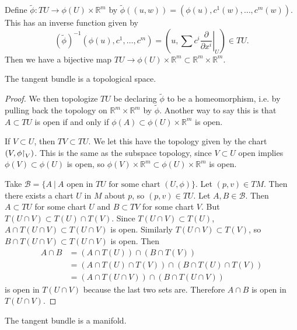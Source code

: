 Define $\tilde{\phi}: TU \to \phi(U) \times \mathbb{R}^m$ by
$\tilde{\phi}((u, w)) = (\phi(u), c^1(w), \dots, c^m(w))$.
This has an inverse function given by
$$
(\tilde{\phi})^{-1}(\phi(u), c^1, \dots, c^m)
= (u, \sum c^i \left.\frac{\partial}{\partial x^i}\right|_U)
\in TU.
$$
Then we have a bijective map
$TU \to \phi(U) \times \mathbb{R}^m \subset \mathbb{R}^m \times
\mathbb{R}^m$.

\begin{prop}
The tangent bundle is a topological space.
\end{prop}

\begin{proof}
We then topologize $TU$ be declaring $\tilde{\phi}$ to be a
homeomorphism, i.e. by pulling back the topology on
$\mathbb{R}^m \times \mathbb{R}^m$ by $\tilde{\phi}$. Another way to
say this is that $A \subset TU$ is open if and only if
$\phi(A) \subset \phi(U) \times \mathbb{R}^m$ is open.

If $V \subset U$, then $TV \subset TU$. We let this have the topology
given by the chart $(V, \phi\mathord{\upharpoonright}_V)$. This is the same as the
subspace topology, since $V \subset U$ open implies
$\phi(V) \subset \phi(U)$ is open, so
$\phi(V) \times \mathbb{R}^m \subset \phi(U) \times \mathbb{R}^m$ is
open.

Take $\mathscr{B} = \{ A ~\vert~ A \text{ open in $TU$ for some chart
  $(U , \phi)$} \}$. Let $(p, v) \in TM$.
Then there exists a chart $U$ in $M$ about $p$, so $(p, v) \in TU$.
Let $A, B \in \mathscr{B}$. Then $A \subset TU$ for some chart $U$
and $B \subset TV$ for some chart $V$.
But $T(U \cap V) \subset T(U) \cap T(V)$.
Since $T(U \cap V) \subset T(U)$,
$A \cap T(U \cap V) \subset T(U \cap V)$ is open. Similarly
$T(U \cap V) \subset T(V)$, so
$B \cap T(U \cap V) \subset T(U \cap V)$ is open. Then
\begin{align*}
   A \cap B
&= (A \cap T(U)) \cap (B \cap T(V)) \\
&= (A \cap T(U) \cap T(V)) \cap (B \cap T(U) \cap T(V)) \\
&= (A \cap T(U \cap V)) \cap (B \cap T(U \cap V))
\end{align*}
is open in $T(U \cap V)$ because the last two sets are. Therefore
$A \cap B$ is open in $T(U \cap V)$.
\end{proof}

\begin{prop}
The tangent bundle is a manifold.
\end{prop}


